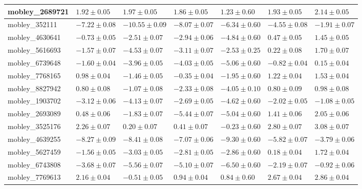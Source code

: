 \documentclass{article}
\begin{document}
\begin{landscape}
\begin{longtable}{|l{3.0cm}|l{3.0cm}|l{3.2cm}|l{3.6cm}|l{3.0cm}|l{3.0cm}|l{3.0cm}|}
mobley\_2689721	&	$	1.92	\pm	0.05	$	&	$	1.97	\pm	0.05	$	&	$	1.86	\pm	0.05	$	&	$	1.23	\pm	0.60	$	&	$	1.93	\pm	0.05	$	&	$	2.14	\pm	0.05	$	\\ \hline
mobley\_352111	&	$	-7.22	\pm	0.08	$	&	$	-10.55	\pm	0.09	$	&	$	-8.07	\pm	0.07	$	&	$	-6.34	\pm	0.60	$	&	$	-4.55	\pm	0.08	$	&	$	-1.91	\pm	0.07	$	\\ \hline
mobley\_4630641	&	$	-0.73	\pm	0.05	$	&	$	-2.51	\pm	0.07	$	&	$	-2.94	\pm	0.06	$	&	$	-4.84	\pm	0.60	$	&	$	0.47	\pm	0.05	$	&	$	1.45	\pm	0.05	$	\\ \hline
mobley\_5616693	&	$	-1.57	\pm	0.07	$	&	$	-4.53	\pm	0.07	$	&	$	-3.11	\pm	0.07	$	&	$	-2.53	\pm	0.25	$	&	$	0.22	\pm	0.08	$	&	$	1.70	\pm	0.07	$	\\ \hline
mobley\_6739648	&	$	-1.60	\pm	0.04	$	&	$	-3.96	\pm	0.05	$	&	$	-4.03	\pm	0.05	$	&	$	-5.06	\pm	0.60	$	&	$	-0.82	\pm	0.04	$	&	$	0.15	\pm	0.04	$	\\ \hline
mobley\_7768165	&	$	0.98	\pm	0.04	$	&	$	-1.46	\pm	0.05	$	&	$	-0.35	\pm	0.04	$	&	$	-1.95	\pm	0.60	$	&	$	1.22	\pm	0.04	$	&	$	1.53	\pm	0.04	$	\\ \hline
mobley\_8827942	&	$	0.80	\pm	0.08	$	&	$	-1.07	\pm	0.08	$	&	$	-2.33	\pm	0.08	$	&	$	-4.05	\pm	0.10	$	&	$	0.80	\pm	0.09	$	&	$	0.98	\pm	0.08	$	\\ \hline
mobley\_1903702	&	$	-3.12	\pm	0.06	$	&	$	-4.13	\pm	0.07	$	&	$	-2.69	\pm	0.05	$	&	$	-4.62	\pm	0.60	$	&	$	-2.02	\pm	0.05	$	&	$	-1.08	\pm	0.05	$	\\ \hline
mobley\_2693089	&	$	0.48	\pm	0.06	$	&	$	-1.83	\pm	0.07	$	&	$	-5.44	\pm	0.07	$	&	$	-5.04	\pm	0.60	$	&	$	1.41	\pm	0.06	$	&	$	2.05	\pm	0.06	$	\\ \hline
mobley\_3525176	&	$	2.26	\pm	0.07	$	&	$	0.20	\pm	0.07	$	&	$	0.41	\pm	0.07	$	&	$	-0.23	\pm	0.60	$	&	$	2.80	\pm	0.07	$	&	$	3.08	\pm	0.07	$	\\ \hline
mobley\_4639255	&	$	-8.27	\pm	0.09	$	&	$	-8.41	\pm	0.08	$	&	$	-7.07	\pm	0.06	$	&	$	-9.30	\pm	0.60	$	&	$	-5.82	\pm	0.07	$	&	$	-3.79	\pm	0.06	$	\\ \hline
mobley\_5627459	&	$	-1.56	\pm	0.05	$	&	$	-3.03	\pm	0.05	$	&	$	-2.81	\pm	0.05	$	&	$	-2.86	\pm	0.60	$	&	$	0.18	\pm	0.04	$	&	$	1.72	\pm	0.04	$	\\ \hline
mobley\_6743808	&	$	-3.68	\pm	0.07	$	&	$	-5.56	\pm	0.07	$	&	$	-5.10	\pm	0.07	$	&	$	-6.50	\pm	0.60	$	&	$	-2.19	\pm	0.07	$	&	$	-0.92	\pm	0.06	$	\\ \hline
mobley\_7769613	&	$	2.16	\pm	0.04	$	&	$	-0.51	\pm	0.05	$	&	$	0.94	\pm	0.04	$	&	$	0.84	\pm	0.60	$	&	$	2.67	\pm	0.04	$	&	$	2.86	\pm	0.04	$	\\ \hline

\end{longtable}
\end{landscape}
\end{document}
